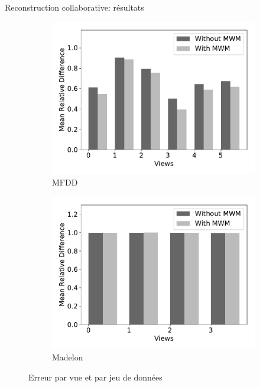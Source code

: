 \documentclass[hyperref={pdfpagelabels=false}]{beamer}
\begin{document}
\begin{frame}{Reconstruction collaborative: résultats}
\begin{figure}[!h]
\begin{subfigure}[c]{0.32\textwidth}
                \includegraphics[scale=.21]{mrd_mfeat}
                \caption{MFDD}
            \end{subfigure}
            \begin{subfigure}[c]{0.32\textwidth}
                \includegraphics[scale=.21]{mrd_madelon}
                \caption{Madelon}
            \end{subfigure}
            \caption{Erreur par vue et par jeu de données}
        \end{figure}
    \end{frame}
\end{document}
